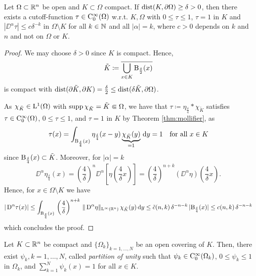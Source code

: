 \begin{lem}
  \label{lem:cutoff}
  Let $\Omega \subset \mathbb{R}^n$ be open and $K \subset \Omega$ compact.
  If $\operatorname{dist}(K, \partial \Omega) \geq \delta > 0$, then there exists a cutoff-function $\tau \in \mathrm{C}_0^\infty(\Omega)$ w.r.t. $K, \Omega$ with $0 \leq \tau \leq 1$, $\tau = 1$ in $K$ and $|\DD^\alpha \tau | \leq c \delta^{-k}$ in $\Omega \setminus K$ for all $k \in \mathbb{N}$ and all $|\alpha| = k$, where $c > 0$ depends on $k$ and $n$ and not on $\Omega$ or $K$.
\end{lem}

\begin{proof}
  We may choose $\delta > 0$ since $K$ is compact.
  Hence, 
  $$
  \tilde K \coloneqq \overline{\bigcup_{x \in K} \mathrm{B}_{\frac{\delta}{2}}(x)}
  $$
  is compact with $\operatorname{dist}(\partial \tilde K, \partial K) = \frac{\delta}{2} \leq \operatorname{dist}(\delta \tilde K, \partial \Omega)$.

  As $\chi_{\tilde K} \in \mathrm{L}^1(\Omega)$ with $\operatorname{supp} \chi_{\tilde K} = \tilde K \Subset \Omega$, we have that $\tau \coloneqq \eta_{\frac{\delta}{4}} \ast \chi_{\tilde K}$ satisfies $\tau \in \mathrm{C}_0^\infty(\Omega)$, $0 \leq \tau \leq 1$, and $\tau = 1$ in $K$ by Theorem \ref{thm:mollifier}, as
  $$
  \tau(x) 
  = \int_{\mathrm{B}_{\frac{\delta}{4}}(x)}\eta_{\frac{\delta}{4}}(x - y) \underbrace{\chi_{\tilde K}(y)}_{= 1} \, {\operatorname{d}\!{y}} 
  = 1 \quad\text{for all }x \in K
  $$
  since $\mathrm{B}_{\frac{\delta}{4}}(x) \subset \tilde K$.
  Moreover, for $|\alpha| = k$
  $$
  \DD^\alpha \eta_{\frac{\delta}{4}}(x) 
  = \left( \frac{4}{\delta}\right)^n \DD^\alpha \left[ \eta \left( \frac{4 }{\delta} x \right) \right] 
  =  \left( \frac{4}{\delta}\right)^{n+k} (\DD^\alpha \eta)\left( \frac{4}{\delta} x \right).
  $$
  Hence, for $x \in \Omega \setminus K$ we have 
  $$
    |\,{\operatorname{D}}^\alpha \tau (x) | 
    \leq \int_{\mathrm{B}_{\frac{\delta}{4}}(x)}\, \left(\frac{4}{\delta}\right)^{n + k}\, \|\,{\operatorname{D}}^\alpha \eta \|_{\mathrm{L}^\infty(\mathbb{R}^n)} \,\chi_{\tilde K}(y) \, {\operatorname{d}\!{y}}
    \leq \tilde c(n,k) \, \delta^{-n - k} \, |\mathrm{B}_{\frac{\delta}{4}}(x)| \leq c(n,k)\, \delta^{-n-k}
 $$
 which concludes the proof.
\end{proof}

\begin{lem}
  \label{lem:partitionOfUnity}
  Let $K \subset \mathbb{R}^n$ be compact and $\{\Omega_k\}_{k = 1,\dots,N}$ be an open covering of $K$.
  Then, there exist $\psi_k, k=1,\dots,N$, called \emph{partition of unity} such that $\psi_k \in \mathrm{C}_0^\infty(\Omega_k)$, $0 \leq \psi_k \leq 1$ in $\Omega_k$, and $\sum_{k = 1}^N \psi_k(x) = 1$ for all $x \in K$.
\end{lem}

